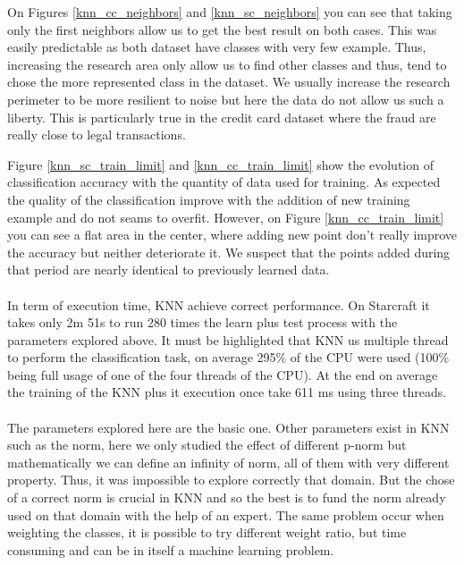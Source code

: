 \documentclass[twocolumn,a4paper,10pt]{article}
\begin{document}
On Figures \ref{knn_cc_neighbors} and \ref{knn_sc_neighbors} you can see that taking only the first neighbors allow us to get the best result on both cases. This was easily predictable as both dataset have classes with very few example. Thus, increasing the research area only allow us to find other classes and thus, tend to chose the more represented class in the dataset. We usually increase the research perimeter to be more resilient to noise but here the data do not allow us such a liberty. This is particularly true in the credit card dataset where the fraud are really close to legal transactions.

Figure \ref{knn_sc_train_limit} and \ref{knn_cc_train_limit} show the evolution of classification accuracy with the quantity of data used for training. As expected the quality of the classification improve with the addition of new training example and do not seams to overfit. However, on Figure \ref{knn_cc_train_limit} you can see a flat area in the center, where adding new point don't really improve the accuracy but neither deteriorate it. We suspect that the points added during that period are nearly identical to previously learned data.

\paragraph{}
In term of execution time, KNN achieve correct performance. On Starcraft it takes only 2m 51s to run 280 times the learn plus test process with the parameters explored above. It must be highlighted that KNN us multiple thread to perform the classification task, on average 295\% of the CPU were used (100\% being full usage of one of the four threads of the CPU). At the end on average the training of the KNN plus it execution once take 611 ms using three threads.


\paragraph{}
The parameters explored here are the basic one. Other parameters exist in KNN such as the norm, here we only studied the effect of different p-norm but mathematically we can define an infinity of norm, all of them with very different property. Thus, it was impossible to explore correctly that domain. But the chose of a correct norm is crucial in KNN and so the best is to fund the norm already used on that domain with the help of an expert. The same problem occur when weighting the classes, it is possible to try different weight ratio, but time consuming and can be in itself a machine learning problem.
\end{document}

